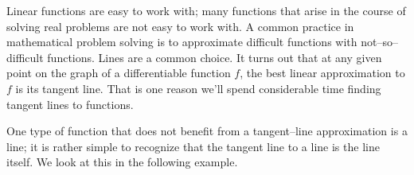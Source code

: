 %
%
%

Linear functions are easy to work with; many functions that arise in the course of solving real problems are not easy to work with. A common practice in mathematical problem solving is to approximate difficult functions with not--so--difficult functions. Lines are a common choice. It turns out that at any given point on the graph of a differentiable function $f$, the best linear approximation to $f$ is its tangent line. That is one reason we'll spend considerable time finding tangent lines to functions.

One type of function that does not benefit from a tangent--line approximation is a line; it is rather simple to recognize that the tangent line to a line is the line itself. We look at this in the following example.\\

